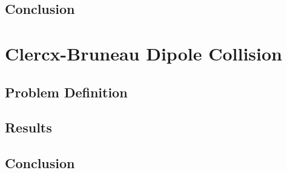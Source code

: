 %

\subsection{Conclusion}



\section{Clercx-Bruneau Dipole Collision}

\subsection{Problem Definition}

\subsection{Results}

\subsection{Conclusion}

%
%
%
%

